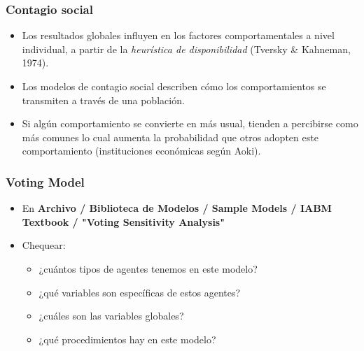 \documentclass[11pt]{beamer}
\begin{document}
\begin{frame}
	\frametitle{Contagio social}
\begin{itemize}
	\item Los resultados globales influyen en los factores comportamentales a nivel individual, a partir de la \textit{heurística de disponibilidad} (Tversky \& Kahneman, 1974).
    \item Los modelos de contagio social describen cómo los comportamientos se transmiten a través de una población.
    \item Si algún comportamiento se convierte en más usual, tienden a percibirse como más comunes lo cual aumenta la probabilidad que otros adopten este comportamiento (instituciones económicas según Aoki).
\end{itemize}
\end{frame}

\begin{frame}
	\frametitle{Voting Model}
\begin{itemize}
	\item En \textbf{Archivo / Biblioteca de Modelos / Sample Models / IABM Textbook / "Voting Sensitivity Analysis"}
	\item Chequear:
	\begin{itemize}
		\item ¿cuántos tipos de agentes tenemos en este modelo?
		\item ¿qué variables son específicas de estos agentes? 
		\item ¿cuáles son las variables globales?
		\item ¿qué procedimientos hay en este modelo?
	\end{itemize}
\end{itemize}		
\end{frame}
\end{document}
